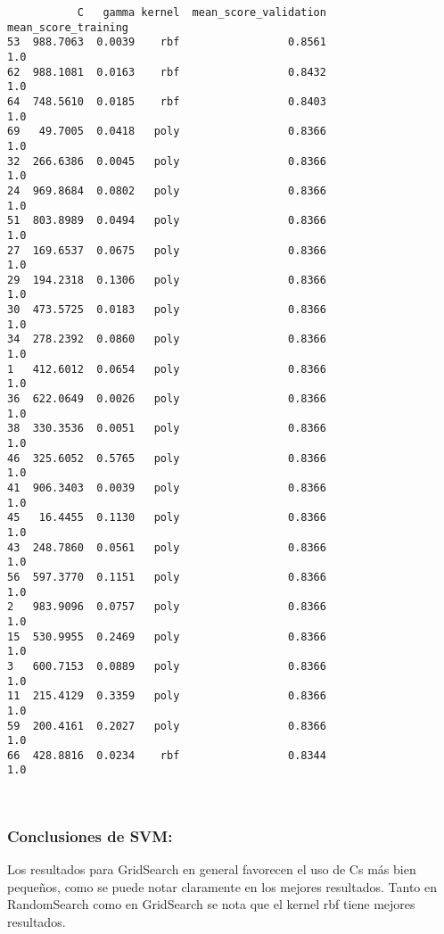 \documentclass[11pt]{article}
\begin{document}
    
    \begin{verbatim}
           C   gamma kernel  mean_score_validation  mean_score_training
53  988.7063  0.0039    rbf                 0.8561                  1.0
62  988.1081  0.0163    rbf                 0.8432                  1.0
64  748.5610  0.0185    rbf                 0.8403                  1.0
69   49.7005  0.0418   poly                 0.8366                  1.0
32  266.6386  0.0045   poly                 0.8366                  1.0
24  969.8684  0.0802   poly                 0.8366                  1.0
51  803.8989  0.0494   poly                 0.8366                  1.0
27  169.6537  0.0675   poly                 0.8366                  1.0
29  194.2318  0.1306   poly                 0.8366                  1.0
30  473.5725  0.0183   poly                 0.8366                  1.0
34  278.2392  0.0860   poly                 0.8366                  1.0
1   412.6012  0.0654   poly                 0.8366                  1.0
36  622.0649  0.0026   poly                 0.8366                  1.0
38  330.3536  0.0051   poly                 0.8366                  1.0
46  325.6052  0.5765   poly                 0.8366                  1.0
41  906.3403  0.0039   poly                 0.8366                  1.0
45   16.4455  0.1130   poly                 0.8366                  1.0
43  248.7860  0.0561   poly                 0.8366                  1.0
56  597.3770  0.1151   poly                 0.8366                  1.0
2   983.9096  0.0757   poly                 0.8366                  1.0
15  530.9955  0.2469   poly                 0.8366                  1.0
3   600.7153  0.0889   poly                 0.8366                  1.0
11  215.4129  0.3359   poly                 0.8366                  1.0
59  200.4161  0.2027   poly                 0.8366                  1.0
66  428.8816  0.0234    rbf                 0.8344                  1.0
    \end{verbatim}

    
    \begin{Verbatim}[commandchars=\\\{\}]
 

    \end{Verbatim}

    \subsubsection{Conclusiones de SVM:}\label{conclusiones-de-svm}

Los resultados para GridSearch en general favorecen el uso de Cs más
bien pequeños, como se puede notar claramente en los mejores resultados.
Tanto en RandomSearch como en GridSearch se nota que el kernel rbf tiene
mejores resultados.
\end{document}
